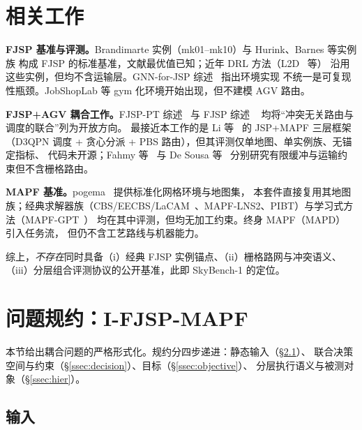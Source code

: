 \documentclass[UTF8,12pt,a4paper]{ctexart}
\begin{document}
\section{相关工作}\label{sec:related}

\textbf{FJSP 基准与评测。}Brandimarte 实例（mk01--mk10）与 Hurink、Barnes 等实例族
构成 FJSP 的标准基准，文献最优值已知；近年 DRL 方法（L2D~\cite{zhang2020l2d} 等）
沿用这些实例，但均不含运输层。GNN-for-JSP 综述~\cite{smit2025gnn} 指出环境实现
不统一是可复现性瓶颈。JobShopLab 等 gym 化环境开始出现，但不建模 AGV 路由。

\textbf{FJSP+AGV 耦合工作。}FJSP-PT 综述~\cite{xin2025fjsppt} 与 FJSP 综述
~\cite{dauzere2024fjsp} 均将``冲突无关路由与调度的联合''列为开放方向。
最接近本工作的是 Li 等~\cite{li2026framework} 的 JSP+MAPF 三层框架
（D3QPN 调度 + 贪心分派 + PBS 路由），但其评测仅单地图、单实例族、无锚定指标、
代码未开源；Fahmy 等~\cite{fahmy2008deadlock} 与 De Sousa 等~\cite{desousa2024buffer}
分别研究有限缓冲与运输约束但不含栅格路由。

\textbf{MAPF 基准。}pogema~\cite{pogema2024} 提供标准化网格环境与地图集，
本套件直接复用其地图族；经典求解器族（CBS/EECBS/LaCAM~\cite{okumura2023lacam,
okumura2023lacamstar}、MAPF-LNS2、PIBT）与学习式方法（MAPF-GPT~\cite{andreychuk2025mapfgpt}）
均在其中评测，但均无加工约束。终身 MAPF（MAPD）~\cite{ma2017mapd} 引入任务流，
但仍不含工艺路线与机器能力。

综上，\emph{不存在}同时具备（i）经典 FJSP 实例锚点、（ii）栅格路网与冲突语义、
（iii）分层组合评测协议的公开基准，此即 SkyBench-1 的定位。

\section{问题规约：I-FJSP-MAPF}\label{sec:formulation}

本节给出耦合问题的严格形式化。规约分四步递进：静态输入（\S\ref{ssec:input}）、
联合决策空间与约束（\S\ref{ssec:decision}）、目标（\S\ref{ssec:objective}）、
分层执行语义与被测对象（\S\ref{ssec:hier}）。

\subsection{输入}\label{ssec:input}
\end{document}
